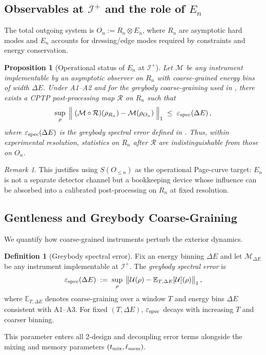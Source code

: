 \documentclass[a4paper,11pt]{article}
\let\mathscr\mathcal
\theoremstyle{plain}
\newtheorem{proposition}{Proposition}
\theoremstyle{definition}
\newtheorem{definition}{Definition}
\theoremstyle{remark}
\newtheorem{remark}{Remark}
\begin{document}
\subsection{Observables at \texorpdfstring{$\mathscr{I}^+$}{I+} and the role of \texorpdfstring{$E_n$}{En}}
\label{sec:Iplus-En}
The total outgoing system is $O_n := R_n\otimes E_n$, where $R_n$ are asymptotic hard modes and $E_n$ accounts for dressing/edge modes required by constraints and energy conservation.
\begin{proposition}[Operational status of $E_n$ at $\mathscr{I}^+$]\label{prop:En-operational}
Let $\mathcal{M}$ be any instrument implementable by an asymptotic observer on $R_n$ with coarse-grained energy bins of width $\Delta E$. Under A1--A2 and for the greybody coarse-graining used in , there exists a CPTP post-processing map $\mathcal{R}$ on $R_n$ such that
\begin{equation*}
\sup_{\rho}\;\Big\|\; (\mathcal{M}\circ\mathcal{R})(\rho_{R_n}) - \mathcal{M}(\rho_{O_n}) \;\Big\|_1 \;\le\; \varepsilon_{\rm spec}(\Delta E)\,,
\end{equation*}
where $\varepsilon_{\rm spec}(\Delta E)$ is the greybody spectral error defined in . Thus, within experimental resolution, statistics on $R_n$ after $\mathcal{R}$ are indistinguishable from those on $O_n$.
\end{proposition}
\begin{remark}
This justifies using $S(O_{\le n})$ as the operational Page-curve target: $E_n$ is not a separate detector channel but a bookkeeping device whose influence can be absorbed into a calibrated post-processing on $R_n$ at fixed resolution.
\end{remark}

\subsection{Gentleness and Greybody Coarse-Graining} %
\label{sec:gentleness}
We quantify how coarse-grained instruments perturb the exterior dynamics.
\begin{definition}[Greybody spectral error]
Fix an energy binning $\Delta E$ and let $\mathcal{M}_{\Delta E}$ be any instrument implementable at $\mathscr{I}^+$. The \emph{greybody spectral error} is
\begin{equation*}
\varepsilon_{\rm spec}(\Delta E) \;:=\; \sup_{\rho}\; \big\| \mathcal{U}(\rho) - \mathbb{E}_{T,\Delta E}[\mathcal{U}](\rho) \big\|_1\,,
\end{equation*}
where $\mathbb{E}_{T,\Delta E}$ denotes coarse-graining over a window $T$ and energy bins $\Delta E$ consistent with A1--A3. For fixed $(T,\Delta E)$, $\varepsilon_{\rm spec}$ decays with increasing $T$ and coarser binning.
\end{definition}
This parameter enters all 2-design and decoupling error terms alongside the mixing and memory parameters $(t_{\rm mix},\ell_{\rm mem})$.
\end{document}
